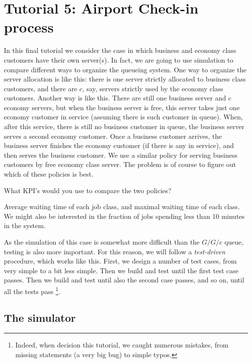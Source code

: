 \section{Tutorial 5: Airport Check-in process}
\label{sec:simul-check-proc}

In this final tutorial we consider the case in which business and economy class customers have their own server(s).
In fact, we are going to use simulation to compare different ways to organize the queueing system.
One way to organize the server allocation is like this: there is one server strictly allocated to business class customers, and there are $c$, say, servers strictly used by the economy class customers.
Another way is like this.
There are still one business server and $c$ economy servers, but when the business server is free, this server takes just one economy customer in service (assuming there is such customer in queue).
When, after this service, there is still no business customer in queue, the business server serves a second economy customer.
Once a business customer arrives, the business server finishes the economy customer (if there is any in service), and then serves the business customer.
We use a similar policy for serving business customers by free economy class server.
The problem is of course to figure out which of these policies is best.


\begin{exercise}
  What KPI's would you use to compare the two policies?
\begin{solution}
    Average waiting time of each job class, and maximal waiting time of each class.
    We might also be interested in the fraction of jobs spending less than 10 minutes in the system.
  \end{solution}
\end{exercise}

As the simulation of this case is somewhat more difficult than the $G/G/c$ queue, testing is also more important.
For this reason, we will follow a \emph{test-driven} procedure, which works like this.
First, we design a number of test cases, from very simple to a bit less simple.
Then we build and test until the first test case passes.
Then we build and test until also the second case passes, and so on, until all the tests pass \footnote{Indeed, when decision this tutorial, we caught numerous mistakes, from missing  statements (a very big bug) to simple typos.}.

\subsection{The simulator}
\label{sec:simulator-1}

